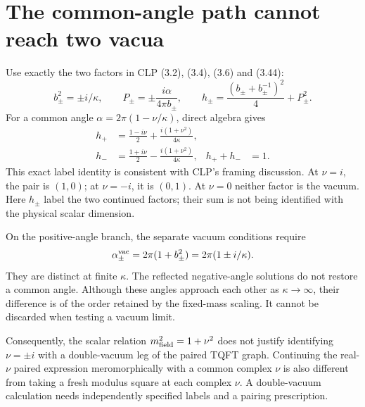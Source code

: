 \documentclass[11pt,a4paper]{article}
\begin{document}
\section{The common-angle path cannot reach two vacua}
Use exactly the two factors in CLP (3.2), (3.4), (3.6) and (3.44):
\begin{equation}
 b_\pm^2=\pm i/\kappa,\qquad
 P_\pm=\pm\frac{i\alpha}{4\pi b_\pm},\qquad
 h_\pm=\frac{(b_\pm+b_\pm^{-1})^2}{4}+P_\pm^2.
\end{equation}
For a common angle \(\alpha=2\pi(1-\nu/\kappa)\), direct algebra gives
\begin{align}
 h_+&=\frac{1-i\nu}{2}+\frac{i(1+\nu^2)}{4\kappa},\\
 h_-&=\frac{1+i\nu}{2}-\frac{i(1+\nu^2)}{4\kappa},&
 h_++h_-&=1. \label{eq:weights}
\end{align}
This exact label identity is consistent with CLP's framing discussion.
At \(\nu=i\), the pair is \((1,0)\); at \(\nu=-i\), it is \((0,1)\).
At \(\nu=0\) neither factor is the vacuum.
Here \(h_\pm\) label the two continued factors; their sum is not
being identified with the physical scalar dimension.

On the positive-angle branch, the separate vacuum conditions require
\begin{equation}
 \alpha^{\rm vac}_\pm=2\pi(1+b_\pm^2)
 =2\pi(1\pm i/\kappa). \label{eq:vacangles}
\end{equation}
They are distinct at finite \(\kappa\).
The reflected negative-angle solutions do not restore a common angle.
Although these angles approach each other as \(\kappa\to\infty\),
their difference is of the order retained by the fixed-mass
scaling. It cannot be discarded when testing a vacuum limit.

Consequently, the scalar relation \(m_{\rm field}^2=1+\nu^2\)
does not justify identifying \(\nu=\pm i\) with a double-vacuum
leg of the paired TQFT graph. Continuing the real-\(\nu\) paired
expression meromorphically with a common complex \(\nu\) is also
different from taking a fresh modulus square at each complex \(\nu\).
A double-vacuum calculation needs independently specified labels
and a pairing prescription.
\end{document}

